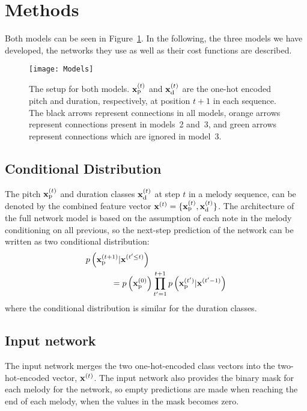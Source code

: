 \section{Methods}
\label{sec:method}

Both models can be seen in Figure~\ref{fig:methods:models}.
In the following, the three models we have developed, the networks they use as well as their cost functions are described.

\begin{figure*}
	\centering
	\texttt{[image: Models]}
	\caption{The setup for both models. $\bm{\mathrm{x}}^{(t)}_{\text{p}}$ and $\bm{\mathrm{x}}^{(t)}_{\text{d}}$ are the one-hot encoded pitch and duration, respectively, at position $t + 1$ in each sequence. The black arrows represent connections in all models, orange arrows represent connections present in models~2 and~3, and green arrows represent connections which are ignored in model~3.}
	\label{fig:methods:models}
\end{figure*}

\subsection{Conditional Distribution} %
\label{sub:conditional_distribution}
	The pitch $\bm{\mathrm{x}}^{(t)}_{\text{p}}$ and duration classes $\bm{\mathrm{x}}^{(t)}_{\text{d}}$ at step $t$ in a melody sequence, can be denoted by the combined feature vector $\bm{\mathrm{x}}^{(t)}=\{\bm{\mathrm{x}}^{(t)}_{\text{p}},\bm{\mathrm{x}}^{(t)}_{\text{d}}\}$.	
	The architecture of the full network model is based on the assumption of each note in the melody conditioning on all previous, so the next-step prediction of the network can be written as two conditional distribution:
	\begin{gather}
		\begin{split}
		\MoveEqLeft[3]
				p\left(\vec{x}\order{t+1}\idx{p}|\vec{x}\order{t'\le t}\right) \\ 
				& = p\left(\vec{x}\order{0}\idx{p}\right) \prod^{t+1}_{t'=1} p\left(\vec{x}\order{t'}\idx{p}|\vec{x}\order{t'-1}\right) \label{}
		\end{split} 	
	\end{gather}
	where the conditional distribution is similar for the duration classes.

\subsection{Input network} %
\label{sub:input_network}
The input network merges the two one-hot-encoded class vectors into the two-hot-encoded vector, $\bm{\mathrm{x}}^{(t)}$. The input network also provides the binary mask for each melody for the network, so empty predictions are made when reaching the end of each melody, when the values in the mask becomes zero.

